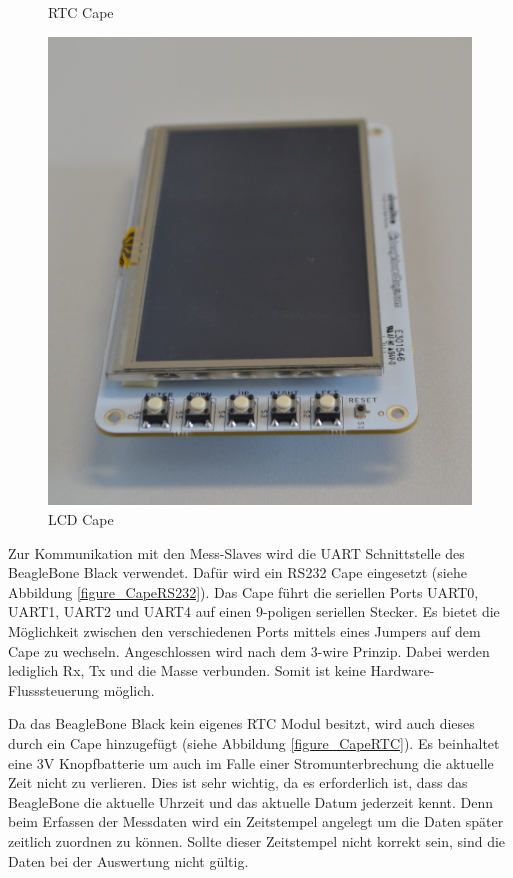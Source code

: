 \begin{figure}[H]
  \caption{RTC Cape}\label{figure_CapeRTC}
\endminipage\hfill
{}%
  \includegraphics[width=\linewidth]{img/general/CapeLCD.png}
  \caption{LCD Cape}\label{figure_CapeLCD}
\endminipage
\end{figure}


Zur Kommunikation mit den Mess-Slaves wird die \ac{UART} Schnittstelle des BeagleBone Black verwendet. Dafür wird ein RS232 Cape eingesetzt (siehe Abbildung \ref{figure_CapeRS232}). Das Cape führt die seriellen Ports UART0, UART1, UART2 und UART4 auf einen 9-poligen seriellen Stecker. Es bietet die Möglichkeit zwischen den verschiedenen Ports mittels eines Jumpers auf dem Cape zu wechseln. Angeschlossen wird nach dem 3-wire Prinzip. Dabei werden lediglich Rx, Tx und die Masse verbunden. Somit ist keine Hardware-Flusssteuerung möglich.\ 

Da das BeagleBone Black kein eigenes \ac{RTC} Modul besitzt, wird auch dieses durch ein Cape hinzugefügt (siehe Abbildung \ref{figure_CapeRTC}). Es beinhaltet eine 3V Knopfbatterie um auch im Falle einer Stromunterbrechung die aktuelle Zeit nicht zu verlieren. Dies ist sehr wichtig, da es erforderlich ist, dass das BeagleBone die aktuelle Uhrzeit und das aktuelle Datum jederzeit kennt. Denn beim Erfassen der Messdaten wird ein Zeitstempel angelegt um die Daten später zeitlich zuordnen zu können. Sollte dieser Zeitstempel nicht korrekt sein, sind die Daten bei der Auswertung nicht gültig.\ 

